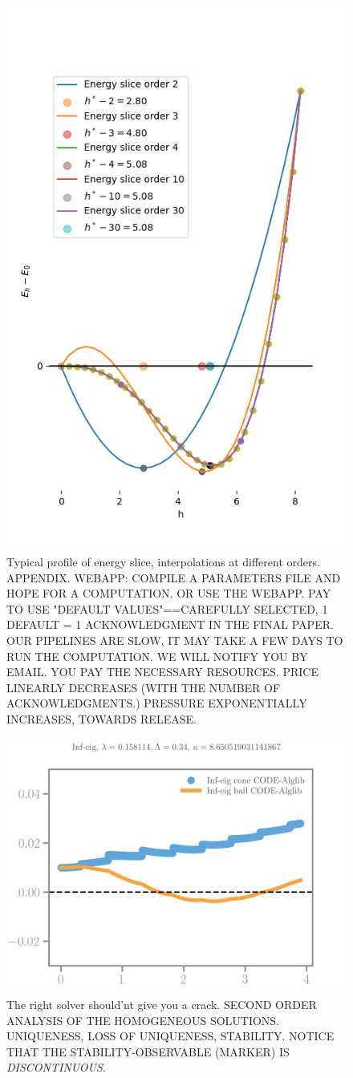 \begin{figure}[htbp]
    \centering
    \includegraphics*[width=.45\textwidth]{../images/energy_interpolation-orders.png}
    \caption{Typical profile of energy slice, interpolations at different orders. APPENDIX. WEBAPP: COMPILE A PARAMETERS FILE AND HOPE FOR A COMPUTATION. OR USE THE WEBAPP. PAY TO USE "DEFAULT VALUES"==CAREFULLY SELECTED, 1 DEFAULT = 1 ACKNOWLEDGMENT IN THE FINAL PAPER. OUR PIPELINES ARE SLOW, IT MAY TAKE A FEW DAYS TO RUN THE COMPUTATION. WE WILL NOTIFY YOU BY EMAIL. YOU PAY THE NECESSARY RESOURCES. PRICE LINEARLY DECREASES (WITH THE NUMBER OF ACKNOWLEDGMENTS.) PRESSURE EXPONENTIALLY INCREASES, TOWARDS RELEASE.}
    \label{fig:energy-slice}
\end{figure}

\begin{figure}[htbp]
    \centering
    \includegraphics*[width=.45\textwidth]{../images/irreversibility_inf_eig.png}
    \caption{The right solver should'nt give you a crack.
    SECOND ORDER ANALYSIS OF THE HOMOGENEOUS SOLUTIONS. UNIQUENESS, LOSS OF UNIQUENESS, STABILITY. NOTICE THAT THE STABILITY-OBSERVABLE (MARKER) IS \emph{DISCONTINUOUS}.
    }
    \label{fig:shouldnt}
\end{figure}

